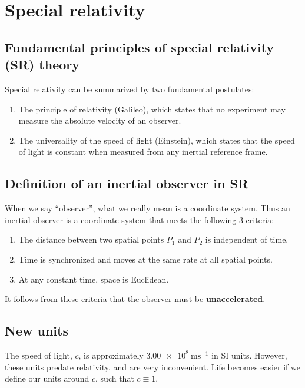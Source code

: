 \documentclass[gr-notes.tex]{subfiles}
\begin{document}
\setcounter{chapter}{0}

\chapter{Special relativity}

\section{Fundamental principles of special relativity (SR) theory}

Special relativity can be summarized by two fundamental postulates:


\begin{enumerate}
\item The principle of relativity (Galileo), which states that no experiment
  may measure the absolute velocity of an observer.
\item The universality of the speed of light (Einstein), which states that
  the speed of light is constant when measured from any inertial reference
  frame.
\end{enumerate}


\section{Definition of an inertial observer in SR}

When we say ``observer'', what we really mean is a coordinate system. Thus an inertial observer is a coordinate system that meets the following 3 criteria:

\begin{enumerate}
\item The distance between two spatial points $P_1$ and $P_2$ is independent of
  time.
\item Time is synchronized and moves at the same rate at all spatial points.
\item At any constant time, space is Euclidean.
\end{enumerate}

It follows from these criteria that the observer must be \textbf{unaccelerated}.

\section{New units}

The speed of light, $c$, is approximately $\SI{3.00e8}{\meter\second^{-1}}$ in SI units. However, these units predate relativity, and are very inconvenient. Life becomes easier if we define our units around $c$, such that $c \equiv 1$.
\end{document}
